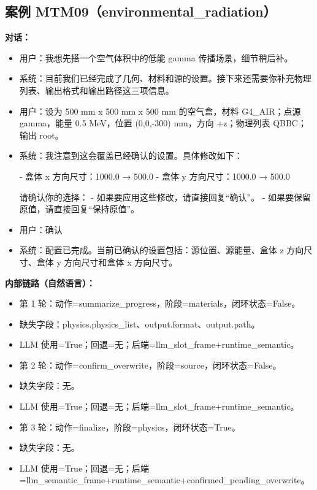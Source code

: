 \documentclass[11pt]{ctexart}
\begin{document}
\subsection{案例 MTM09（environmental\_radiation）}
\textbf{对话：}
\begin{itemize}
\item 用户：我想先搭一个空气体积中的低能 gamma 传播场景，细节稍后补。
\item 系统：目前我们已经完成了几何、材料和源的设置。接下来还需要你补充物理列表、输出格式和输出路径这三项信息。
\item 用户：设为 500 mm x 500 mm x 500 mm 的空气盒，材料 G4\_AIR；点源 gamma，能量 0.5 MeV，位置 (0,0,-300) mm，方向 +z；物理列表 QBBC；输出 root。
\item 系统：我注意到这会覆盖已经确认的设置。具体修改如下：

- 盒体 x 方向尺寸：1000.0 → 500.0
- 盒体 y 方向尺寸：1000.0 → 500.0

请确认你的选择：
- 如果要应用这些修改，请直接回复“确认”。
- 如果要保留原值，请直接回复“保持原值”。
\item 用户：确认
\item 系统：配置已完成。当前已确认的设置包括：源位置、源能量、盒体 z 方向尺寸、盒体 y 方向尺寸和盒体 x 方向尺寸。
\end{itemize}
\textbf{内部链路（自然语言）：}
\begin{itemize}
\item 第 1 轮：动作=summarize\_progress，阶段=materials，闭环状态=False。
\item 缺失字段：physics.physics\_list、output.format、output.path。
\item LLM 使用=True；回退=无；后端=llm\_slot\_frame+runtime\_semantic。
\item 第 2 轮：动作=confirm\_overwrite，阶段=source，闭环状态=False。
\item 缺失字段：无。
\item LLM 使用=True；回退=无；后端=llm\_slot\_frame+runtime\_semantic。
\item 第 3 轮：动作=finalize，阶段=physics，闭环状态=True。
\item 缺失字段：无。
\item LLM 使用=True；回退=无；后端=llm\_semantic\_frame+runtime\_semantic+confirmed\_pending\_overwrite。
\end{itemize}
\end{document}
